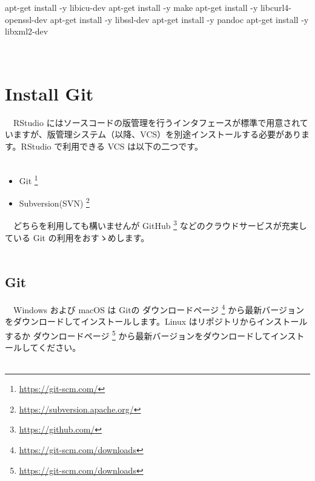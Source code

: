 \documentclass[
  12pt,
]{book}
\newenvironment{Shaded}{\begin{snugshade}}{\end{snugshade}}
\newcommand{\AttributeTok}[1]{\textcolor[rgb]{0.77,0.63,0.00}{#1}}
\newcommand{\ExtensionTok}[1]{#1}
\newcommand{\NormalTok}[1]{#1}
\DeclareRobustCommand{\href}[2]{#2\footnote{\url{#1}}}
\providecommand{\tightlist}{%
  \setlength{\itemsep}{0pt}\setlength{\parskip}{0pt}}
\begin{document}
\begin{Shaded}
\begin{Highlighting}[]
\ExtensionTok{apt{-}get}\NormalTok{ install }\AttributeTok{{-}y}\NormalTok{ libicu{-}dev}
\ExtensionTok{apt{-}get}\NormalTok{ install }\AttributeTok{{-}y}\NormalTok{ make}
\ExtensionTok{apt{-}get}\NormalTok{ install }\AttributeTok{{-}y}\NormalTok{ libcurl4{-}openssl{-}dev}
\ExtensionTok{apt{-}get}\NormalTok{ install }\AttributeTok{{-}y}\NormalTok{ libssl{-}dev}
\ExtensionTok{apt{-}get}\NormalTok{ install }\AttributeTok{{-}y}\NormalTok{ pandoc}
\ExtensionTok{apt{-}get}\NormalTok{ install }\AttributeTok{{-}y}\NormalTok{ libxml2{-}dev}
\end{Highlighting}
\end{Shaded}

　

\hypertarget{install-git}{%
\section{Install Git}\label{install-git}}

　RStudio にはソースコードの版管理を行うインタフェースが標準で用意されていますが、版管理システム（以降、VCS）を別途インストールする必要があります。RStudio で利用できる VCS は以下の二つです。\\
　

\begin{itemize}
\tightlist
\item
  \href{https://git-scm.com/}{Git }
\item
  \href{https://subversion.apache.org/}{Subversion(SVN) }
\end{itemize}

　どちらを利用しても構いませんが \href{https://github.com/}{GitHub } などのクラウドサービスが充実している Git の利用をおすゝめします。\\
　

\hypertarget{git}{%
\subsection{Git}\label{git}}

　Windows および macOS は Gitの \href{https://git-scm.com/downloads}{ダウンロードページ } から最新バージョンをダウンロードしてインストールします。Linux はリポジトリからインストールするか \href{https://git-scm.com/downloads}{ダウンロードページ } から最新バージョンをダウンロードしてインストールしてください。\\
　
\end{document}

